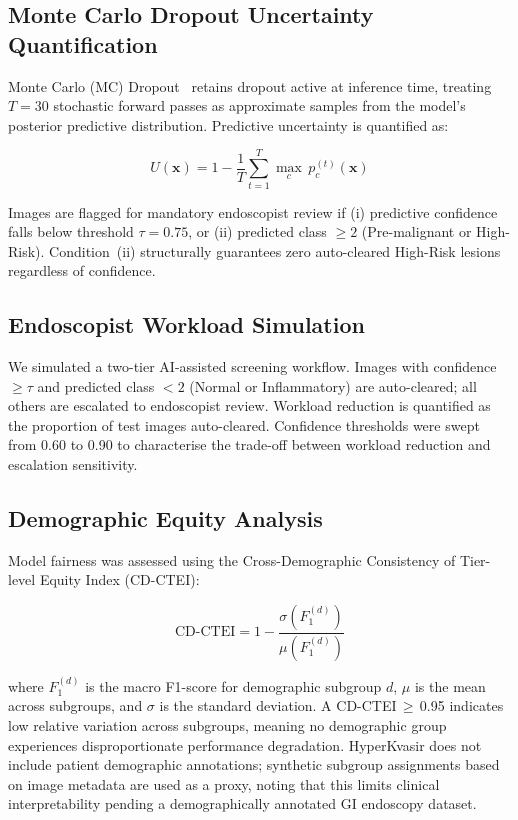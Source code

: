 \documentclass[10pt,a4paper,twocolumn]{article}
\begin{document}
\subsection{Monte Carlo Dropout Uncertainty Quantification}
\label{sec:mcdropout}

Monte Carlo (MC) Dropout~\citep{Gal2016} retains dropout active at inference
time, treating $T=30$ stochastic forward passes as approximate samples from
the model's posterior predictive distribution. Predictive uncertainty is
quantified as:

\begin{equation}
  U(\mathbf{x}) = 1 - \frac{1}{T}\sum_{t=1}^{T}\max_c\, p_c^{(t)}(\mathbf{x})
  \label{eq:uncertainty}
\end{equation}

Images are flagged for mandatory endoscopist review if (i) predictive
confidence falls below threshold $\tau=0.75$, or (ii) predicted class
$\geq2$ (Pre-malignant or High-Risk). Condition~(ii) structurally guarantees
zero auto-cleared High-Risk lesions regardless of confidence.

\subsection{Endoscopist Workload Simulation}
\label{sec:workload}

We simulated a two-tier AI-assisted screening workflow. Images with
confidence $\geq\tau$ and predicted class $<2$ (Normal or Inflammatory) are
auto-cleared; all others are escalated to endoscopist review. Workload
reduction is quantified as the proportion of test images auto-cleared.
Confidence thresholds were swept from 0.60 to 0.90 to characterise the
trade-off between workload reduction and escalation sensitivity.

\subsection{Demographic Equity Analysis}
\label{sec:equity}

Model fairness was assessed using the Cross-Demographic Consistency of
Tier-level Equity Index (CD-CTEI):

\begin{equation}
  \text{CD-CTEI} = 1 - \frac{\sigma(F_1^{(d)})}{\mu(F_1^{(d)})}
  \label{eq:cdctei}
\end{equation}

where $F_1^{(d)}$ is the macro F1-score for demographic subgroup $d$,
$\mu$ is the mean across subgroups, and $\sigma$ is the standard deviation.
A CD-CTEI\,$\geq$\,0.95 indicates low relative variation across subgroups,
meaning no demographic group experiences disproportionate performance
degradation.
HyperKvasir does not include patient demographic annotations; synthetic
subgroup assignments based on image metadata are used as a proxy, noting
that this limits clinical interpretability pending a demographically annotated
GI endoscopy dataset.
\end{document}
